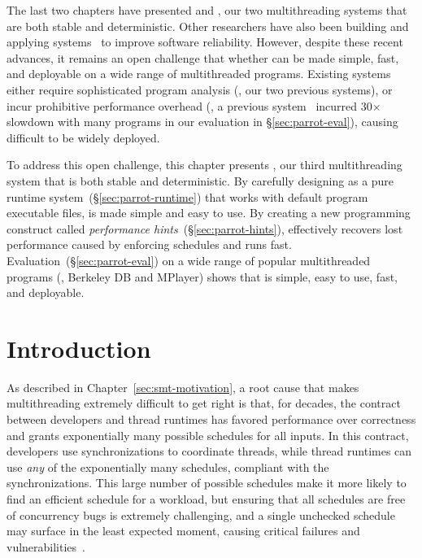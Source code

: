 The last two chapters have presented \tern and \peregrine, our two 
multithreading systems that are both stable and deterministic. Other 
researchers have also been building and applying \smt 
systems~\cite{determinator:osdi10, dthreads:sosp11, bergan:oopsla13} to improve 
software reliability. However, despite these recent advances, it remains an 
open challenge that whether \smt can be made simple, fast, and deployable on a 
wide range of multithreaded programs. Existing systems either require 
sophisticated program analysis (\eg, our two previous systems), or incur 
prohibitive performance overhead (\eg, a previous system~\cite{dthreads:sosp11} 
incurred 30$\times$ slowdown with many programs in our evaluation in 
\S\ref{sec:parrot-eval}), causing \smt difficult to be widely deployed.

To address this open challenge, this chapter presents \parrot, our third 
multithreading system that is both stable and deterministic. By carefully 
designing \parrot as a pure runtime system~(\S\ref{sec:parrot-runtime}) that 
works with default program executable files, \smt is made simple and easy to 
use. By creating a new programming construct called \emph{performance 
hints}~(\S\ref{sec:parrot-hints}), \parrot effectively recovers lost 
performance caused by enforcing \smt schedules and runs fast. 
Evaluation~(\S\ref{sec:parrot-eval}) on a wide range of \nprog popular 
multithreaded programs (\eg, Berkeley DB and MPlayer) shows that \parrot is 
simple, easy to use, fast, and deployable.

\section{Introduction} \label{sec:parrot-intro}

As described in Chapter~\ref{sec:smt-motivation}, a root cause that makes 
multithreading extremely difficult to get right
is that, for decades, the contract between developers and thread runtimes has 
favored performance over correctness and grants exponentially many possible 
schedules for all inputs.  In this contract, developers use 
synchronizations to coordinate threads, while thread runtimes can
use \emph{any} of the exponentially many schedules, 
compliant with the synchronizations.  This large number of possible schedules 
make it more likely to find an efficient schedule for a workload, but ensuring
that all schedules are free of concurrency bugs is extremely challenging, and a 
single unchecked schedule may surface in the least expected moment, causing 
critical failures and vulnerabilities~\cite{therac25-investigation, 
northeast-blackout, lu:concurrency-bugs,con:hotpar12}.

